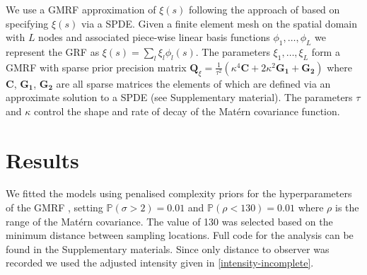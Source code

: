 \documentclass[preprint,12pt]{elsarticle}
\newcommand{\bm}{\boldsymbol}  %
\begin{document}
We use a GMRF approximation of $\xi(s)$ following the approach of \cite{lindgren_explicit_2011} based on specifying $\xi(s)$ via a SPDE.  Given a finite element mesh on the spatial domain with $L$ nodes and associated piece-wise linear basis functions $\phi_1, \ldots, \phi_L$ we represent the GRF as $\xi(s) = \sum_l \xi_l \phi_l(s)$.  The parameters $\xi_1, \ldots, \xi_L$ form a GMRF with sparse prior precision matrix $\bm{Q}_{\xi} = \frac{1}{\tau^2}\left(\kappa^4\bm{C} + 2\kappa^2\bm{G_1} + \bm{G_2}\right)$ where $\bm{C}$, $\bm{G_1}$, $\bm{G_2}$ are all sparse matrices the elements of which are defined via an approximate solution to a SPDE (see Supplementary material). The parameters $\tau$ and $\kappa$ control the shape and rate of decay of the Mat\'ern covariance function.

\section{Results}

We fitted the models using penalised complexity priors for the hyperparameters of the GMRF \citep{simpson_penalising_2017}, setting $\mathbb{P}(\sigma > 2) = 0.01$ and $\mathbb{P}(\rho < 130) = 0.01$ where $\rho$ is the range of the Mat\'ern covariance.  The value of 130 was selected based on the minimum distance between sampling locations.  Full code for the analysis can be found in the Supplementary materials.  Since only distance to observer was recorded we used the adjusted intensity given in \eqref{intensity-incomplete}.   
\end{document}
